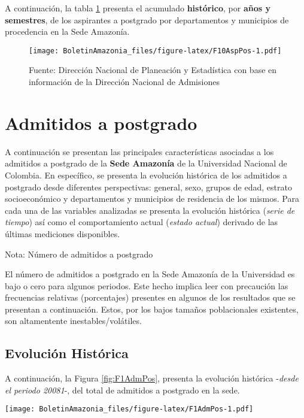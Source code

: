 \documentclass[
]{book}
\begin{document}
A continuación, la tabla \ref{fig:F10AspPos} presenta el acumulado \textbf{histórico}, por \textbf{años y semestres}, de los aspirantes a postgrado por departamentos y municipios de procedencia en la Sede Amazonía.

\begin{figure}
\centering
\texttt{[image: BoletinAmazonia\_files/figure-latex/F10AspPos-1.pdf]}
\caption{\label{fig:F10AspPos}Fuente: Dirección Nacional de Planeación y Estadística con base en información de la Dirección Nacional de Admisiones}
\end{figure}

\hypertarget{AdmPos}{%
\section{Admitidos a postgrado}\label{AdmPos}}

A continuación se presentan las principales características asociadas a los admitidos a postgrado de la \textbf{Sede Amazonía} de la Universidad Nacional de Colombia. En específico, se presenta la evolución histórica de los admitidos a postgrado desde diferentes perspectivas: general, sexo, grupos de edad, estrato socioeconómico y departamentos y municipios de residencia de los mismos. Para cada una de las variables analizadas se presenta la evolución histórica (\emph{serie de tiempo}) así como el comportamiento actual (\emph{estado actual}) derivado de las últimas mediciones disponibles.

Nota: Número de admitidos a postgrado

El número de admitidos a postgrado en la Sede Amazonía de la Universidad es bajo o cero para algunos periodos. Este hecho implica leer con precaución las frecuencias relativas (porcentajes) presentes en algunos de los resultados que se presentan a continuación. Estos, por los bajos tamaños poblacionales existentes, son altamentente inestables/volátiles.

\hypertarget{evoluciuxf3n-histuxf3rica-3}{%
\subsection{Evolución Histórica}\label{evoluciuxf3n-histuxf3rica-3}}

A continuación, la Figura \ref{fig:F1AdmPos}, presenta la evolución histórica -\emph{desde el periodo 20081}-, del total de admitidos a postgrado en la sede.

\texttt{[image: BoletinAmazonia\_files/figure-latex/F1AdmPos-1.pdf]}
\end{document}
